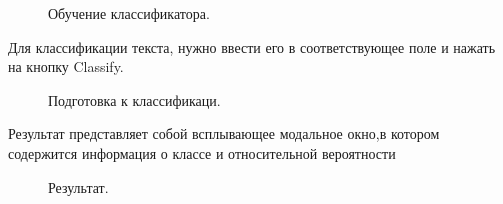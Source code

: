 \documentclass[14pt,a4paper]{extreport}
\begin{document}
    \begin{figure}[h]
    \caption{Обучение классификатора.}
    \label{ris:image}
    \end{figure}
    \newpage
     \par Для классификации текста, нужно ввести его в соответствующее поле и нажать на кнопку Classify.
    \begin{figure}[h]
    \caption{Подготовка к классификаци.}
    \label{ris:image}
    \end{figure}
    \par Результат представляет собой всплывающее модальное окно,в котором содержится информация о классе и относительной вероятности
    \begin{figure}[h]
    \caption{Результат.}
    \label{ris:image}
    \end{figure}
	\newpage
\end{document}
